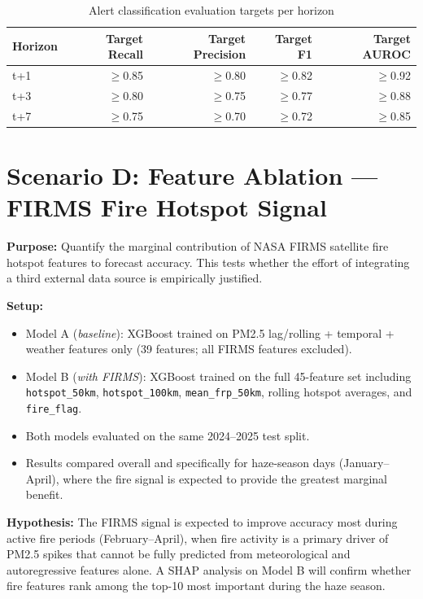 \documentclass[12pt,a4paper]{report}
\begin{document}
\begin{table}[H]
\centering
\caption{Alert classification evaluation targets per horizon}
\label{tab:alert_targets}
\begin{tabular}{@{}lrrrr@{}}
\toprule
\textbf{Horizon} & \textbf{Target Recall} & \textbf{Target Precision} & \textbf{Target F1} & \textbf{Target AUROC} \\
\midrule
t+1 & $\geq$0.85 & $\geq$0.80 & $\geq$0.82 & $\geq$0.92 \\
t+3 & $\geq$0.80 & $\geq$0.75 & $\geq$0.77 & $\geq$0.88 \\
t+7 & $\geq$0.75 & $\geq$0.70 & $\geq$0.72 & $\geq$0.85 \\
\bottomrule
\end{tabular}
\end{table}

\section{Scenario D: Feature Ablation --- FIRMS Fire Hotspot Signal}

\textbf{Purpose:} Quantify the marginal contribution of NASA FIRMS satellite fire hotspot features to forecast accuracy. This tests whether the effort of integrating a third external data source is empirically justified.

\textbf{Setup:}
\begin{itemize}
  \item Model A (\textit{baseline}): XGBoost trained on PM2.5 lag/rolling + temporal + weather features only (39 features; all FIRMS features excluded).
  \item Model B (\textit{with FIRMS}): XGBoost trained on the full 45-feature set including \texttt{hotspot\_50km}, \texttt{hotspot\_100km}, \texttt{mean\_frp\_50km}, rolling hotspot averages, and \texttt{fire\_flag}.
  \item Both models evaluated on the same 2024--2025 test split.
  \item Results compared overall and specifically for haze-season days (January--April), where the fire signal is expected to provide the greatest marginal benefit.
\end{itemize}

\textbf{Hypothesis:} The FIRMS signal is expected to improve accuracy most during active fire periods (February--April), when fire activity is a primary driver of PM2.5 spikes that cannot be fully predicted from meteorological and autoregressive features alone. A SHAP analysis on Model B will confirm whether fire features rank among the top-10 most important during the haze season.
\end{document}
